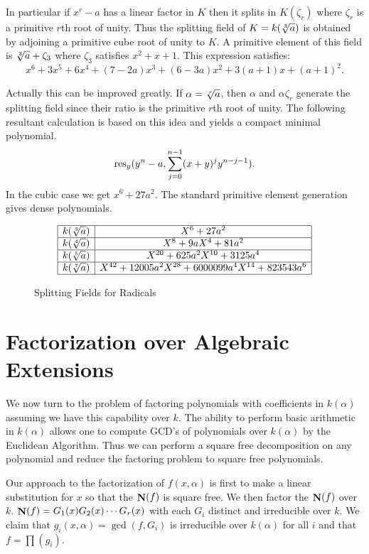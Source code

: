 In particular if $x^r - a$ has a linear factor in $K$ then it splits in
$K(\zeta_r)$ where $\zeta_r$ is a primitive $r$th root of unity.  Thus the
splitting field of $K = k(\root 3 \of{a})$ is obtained by adjoining a
primitive cube root of unity to $K$.  A primitive element of this field is
$\root 3 \of{a} + \zeta_3$ where $\zeta_3$ satisfies $x^2 + x + 1$.  This
expression satisfies:
\[
x^6 + 3 x^5 + 6 x^4 + (7 - 2a) x^3 + (6 - 3 a)  x^2 + 3 (a + 1) x 
    + (a + 1)^2.
\]

Actually this can be improved greatly.  If $\alpha = \root r \of{a}$,
then $\alpha$ and $\alpha \zeta_r$ generate the splitting field since
their ratio is the primitive $r$th root of unity.  The following
resultant calculation is based on this idea and yields a compact
minimal polynomial.
\[
\mathop{\rm res}\nolimits_y(y^n - a, \sum_{j=0}^{n-1} (x + y)^j y^{n - j - 1}).
\]
In the cubic case we get $x^6 + 27 a^2$.  The standard primitive
element generation gives dense polynomials.

\begin{figure}
\[
\begin{array}{|c|c|} \hline
k(\sqrt[3]{a}) & X^6 + 27 a^2 \\ \hline
k(\sqrt[4]{a}) & X^8 + 9 a X^4 +81 a^2 \\ \hline
k(\sqrt[5]{a}) & X^{20} + 625 a^2 X^{10} + 3125 a^4\\ \hline
k(\sqrt[7]{a}) & X^{42} + 12005 a^2 X^{28} + 6000099 a^4 X^{14}
+823543 a^6 \\ \hline
\end{array}
\]
\caption{Splitting Fields for Radicals}
\end{figure}


\section{Factorization over Algebraic Extensions}
\label{Algebraic:Factoring:Sec}

We now turn to the problem of factoring polynomials with coefficients
in $k(\alpha)$ assuming we have this capability over $k$.  The ability
to perform basic arithmetic in $k(\alpha)$ allows one to compute GCD's
of polynomials over $k(\alpha)$ by the Euclidean Algorithm.  Thus we
can perform a square free decomposition on any polynomial and reduce
the factoring problem to square free polynomials.

Our approach to the factorization of $f(x,\alpha)$ is first to make a
linear substitution for $x$ so that the $\mathop{\mathbf{N}}\nolimits(f)$ is square free.  We
then factor the $\mathop{\mathbf{N}}\nolimits(f)$ over $k$.  $\mathop{\mathbf{N}}\nolimits(f)=G_1(x) G_2(x) \cdots
G_r(x)$ with each $G_i$ distinct and irreducible over $k$.  We claim
that $g_i(x,\alpha)=\gcd(f,G_i)$ is irreducible over $k(\alpha)$ for
all $i$ and that $f=\prod(g_i)$.

